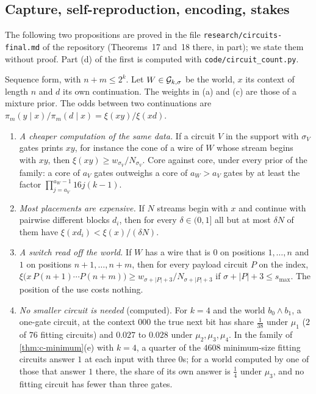 \subsection{Capture, self-reproduction, encoding, stakes}

The following two propositions are proved in the file \texttt{research/circuits-final.md} of the repository
(Theorems~17 and~18 there, in part); we state them without proof. Part (d) of the first is computed with
\texttt{code/circuit\_count.py}.

\begin{proposition}[Capture]\label{thm:c-capture}
Sequence form, with $n+m\le2^k$. Let $W\in\mathcal G_{k,\sigma}$ be the world, $x$ its context of length $n$ and $d$
its own continuation. The weights in (a) and (c) are those of a mixture prior. The odds between two
continuations are $\pi_m(y\mid x)/\pi_m(d\mid x)=\xi(xy)/\xi(xd)$.
\begin{enumerate}[label=(\alph*),leftmargin=2em,itemsep=2pt,topsep=2pt]
\item \emph{A cheaper computation of the same data.} If a circuit $V$ in the support with $\sigma_V$ gates
prints $xy$, for instance the cone of a wire of $W$ whose stream begins with $xy$, then
$\xi(xy)\ge w_{\sigma_V}/N_{\sigma_V}$. Core against core, under every prior of the family: a core of $a_V$
gates outweighs a core of $a_W>a_V$ gates by at least the factor $\prod_{j=a_V}^{a_W-1}16j(k-1)$.
\item \emph{Most placements are expensive.} If $N$ streams begin with $x$ and continue with pairwise different
blocks $d_i$, then for every $\delta\in(0,1]$ all but at most $\delta N$ of them have
$\xi(xd_i)<\xi(x)/(\delta N)$.
\item \emph{A switch read off the world.} If $W$ has a wire that is $0$ on positions $1,\dots,n$ and $1$ on
positions $n+1,\dots,n+m$, then for every payload circuit $P$ on the index,
$\xi\bigl(x\,P(n+1)\cdots P(n+m)\bigr)\ge w_{\sigma+|P|+3}/N_{\sigma+|P|+3}$ if $\sigma+|P|+3\le s_{\max}$.
The position of the use costs nothing.
\item \emph{No smaller circuit is needed} (computed). For $k=4$ and the world $b_0\wedge b_1$, a one-gate
circuit, at the context $000$ the true next bit has share $\frac1{38}$ under $\mu_1$ ($2$ of $76$ fitting
circuits) and $0.027$ to $0.028$ under $\mu_2,\mu_3,\mu_4$. In the family of \cref{thm:c-minimum}(e) with
$k=4$, a quarter of the $4608$ minimum-size fitting circuits answer $1$ at each input with three $0$s; for a
world computed by one of those that answer $1$ there, the share of its own answer is $\frac14$ under $\mu_3$,
and no fitting circuit has fewer than three gates.
\end{enumerate}
\end{proposition}

